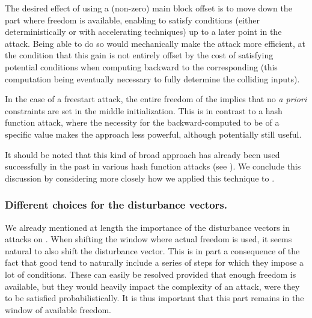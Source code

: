 The desired effect of using a (non-zero) main block offset is to move down the part where freedom is available, enabling to satisfy conditions (either deterministically or with accelerating techniques)
up to a later point in the attack. Being able to do so would mechanically make the attack more efficient, at the condition that this gain is not entirely offset by the cost
of satisfying potential conditions when computing backward to the corresponding \iv (this computation being eventually necessary to fully determine the colliding inputs).

In the case of a freestart attack, the entire freedom of the \iv implies that no \emph{a priori} constraints are set in the middle initialization. This is in contrast to a hash function attack, where
the necessity for the backward-computed \iv to be of a specific value makes the approach less powerful, although potentially still useful.


%
%
%
%

It should be noted that this kind of broad approach has already been used successfully in the past in various hash function attacks (see \eg \cite{DBLP:conf/fse/Dobbertin96,DBLP:conf/eurocrypt/LandelleP13,DBLP:conf/fse/MendelRS14}).
We conclude this discussion by considering more closely how we applied this technique to \shaone.

\subsubsection{Different choices for the disturbance vectors.}
We already mentioned at length the importance of the disturbance vectors in attacks on \shaone.
When shifting the window where actual freedom is used, it seems natural to also shift the disturbance vector.
This is in part a consequence of the fact that good \dvs tend to naturally include a series of steps for which they impose a lot of conditions. These can easily be resolved provided that
enough freedom is available, but they would heavily impact the complexity of an attack, were they to be satisfied probabilistically. It is thus important that this part remains
in the window of available freedom.

